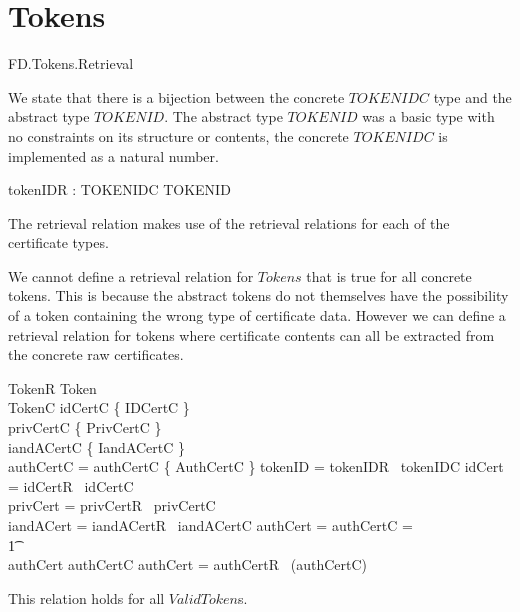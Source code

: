 \section{Tokens}

\begin{traceunit}{FD.Tokens.Retrieval}
\end{traceunit}

We state that there is a bijection between the concrete $TOKENIDC$ type
and the abstract type $TOKENID$. The abstract type $TOKENID$ was a basic
type with no constraints on its structure or contents, the concrete
$TOKENIDC$ is implemented as a natural number.

\begin{axdef}
        tokenIDR : TOKENIDC \bij TOKENID
\end{axdef}

The retrieval relation makes use of the retrieval relations for each
of the certificate types.

We cannot define a retrieval relation for $Tokens$ that is true for
all concrete tokens. This is because the abstract tokens do not
themselves have the possibility of a token containing the wrong type
of certificate data. However we can define a retrieval relation for
tokens where certificate contents can all be extracted from the
concrete raw certificates.

\begin{schema}{TokenR}
        Token
\\      TokenC
\where
        idCertC \in \{ IDCertC \}
\\      privCertC \in \{ PrivCertC \}
\\      iandACertC \in \{ IandACertC \}  
\\      authCertC = \Nil \lor \The authCertC \in \{ AuthCertC \}      
\also
        tokenID = tokenIDR~ tokenIDC
\also
        idCert = idCertR~ idCertC
\\      privCert = privCertR~ privCertC
\\      iandACert = iandACertR~ iandACertC
\also
        authCert = \Nil \land authCertC = \Nil
\\ \t1       \lor 
\\      authCert \neq \Nil \land authCertC \neq \Nil 
        \land  \The authCert = authCertR~ (\The authCertC)
\end{schema}

This relation holds for all $ValidToken$s.

